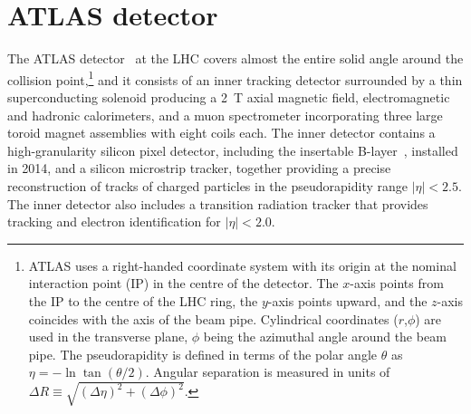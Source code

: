 \section{ATLAS detector}
\label{sec:detector}

The ATLAS detector~\cite{PERF-2007-01} at the LHC covers almost the entire solid angle around the collision point,\footnote{ATLAS 
uses a right-handed coordinate system with its origin at the nominal interaction point (IP) in the 
centre of the detector.  
The $x$-axis points from
the IP to the centre of the LHC ring, %
the $y$-axis points upward,
and the $z$-axis coincides with the axis of the beam pipe.
Cylindrical coordinates ($r$,$\phi$) are used 
in the transverse plane, $\phi$ being the azimuthal angle around the beam pipe. The pseudorapidity is defined in 
terms of the polar angle $\theta$ as $\eta = - \ln \tan(\theta/2)$.
Angular separation is measured in units of $\Delta R\equiv \sqrt{(\Delta\eta)^2+(\Delta\phi)^2}$.} and it consists of an inner tracking detector surrounded by a thin superconducting solenoid producing a
2~T axial magnetic field, electromagnetic and hadronic calorimeters, and a muon spectrometer incorporating three large toroid magnet assemblies with eight coils each. The inner detector contains a high-granularity silicon pixel detector, including the %
insertable B-layer~\cite{IBL1,IBL2,Abbott:2018ikt}, installed in 2014, and a silicon microstrip tracker, together providing a precise reconstruction of tracks of charged particles in the pseudorapidity range $|\eta|<2.5$.
The inner detector also includes a transition radiation tracker that provides tracking and electron identification for $|\eta|<2.0$.
